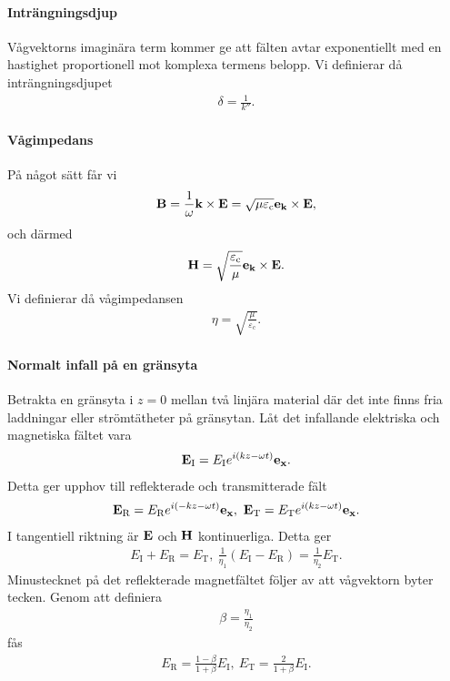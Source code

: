 \paragraph{Inträngningsdjup}
Vågvektorns imaginära term kommer ge att fälten avtar exponentiellt med en hastighet proportionell mot komplexa termens belopp. Vi definierar då inträngningsdjupet
\begin{align*}
	\delta = \frac{1}{k''}.
\end{align*}

\paragraph{Vågimpedans}
På något sätt får vi
\begin{align*}
	\vb{B} = \frac{1}{\omega}\vb{k}\times\vb{E} = \sqrt{\mu\varepsilon_{\text{c}}}\vb{e}_{\vb{k}}\times\vb{E},
\end{align*}
och därmed
\begin{align*}
	\vb{H} = \sqrt{\frac{\varepsilon_{\text{c}}}{\mu}}\vb{e}_{\vb{k}}\times\vb{E}.
\end{align*}
Vi definierar då vågimpedansen
\begin{align*}
	\eta = \sqrt{\frac{\mu}{\varepsilon_{\text{c}}}}.
\end{align*}

\paragraph{Normalt infall på en gränsyta}
Betrakta en gränsyta i $z = 0$ mellan två linjära material där det inte finns fria laddningar eller strömtätheter på gränsytan. Låt det infallande elektriska och magnetiska fältet vara
\begin{align*}
	\vb{E}_{\text{I}} = E_{\text{I}}e^{i(kz - \omega t)}\vb{e}_{\vb{x}}.
\end{align*}
Detta ger upphov till reflekterade och transmitterade fält
\begin{align*}
	\vb{E}_{\text{R}} = E_{\text{R}}e^{i(-kz - \omega t)}\ub{x},\ \vb{E}_{\text{T}} = E_{\text{T}}e^{i(kz - \omega t)}\ub{x}.
\end{align*}
I tangentiell riktning är $\vb{E}$ och $\vb{H}$ kontinuerliga. Detta ger
\begin{align*}
	E_{\text{I}} + E_{\text{R}} = E_{\text{T}},\ \frac{1}{\eta_{1}}(E_{\text{I}} - E_{\text{R}}) = \frac{1}{\eta_{2}}E_{\text{T}}.
\end{align*}
Minustecknet på det reflekterade magnetfältet följer av att vågvektorn byter tecken. Genom att definiera
\begin{align*}
	\beta = \frac{\eta_{1}}{\eta_{2}}
\end{align*}
fås
\begin{align*}
	E_{\text{R}} = \frac{1 - \beta}{1 + \beta}E_{\text{I}},\ E_{\text{T}} = \frac{2}{1 + \beta}E_{\text{I}}.
\end{align*}

